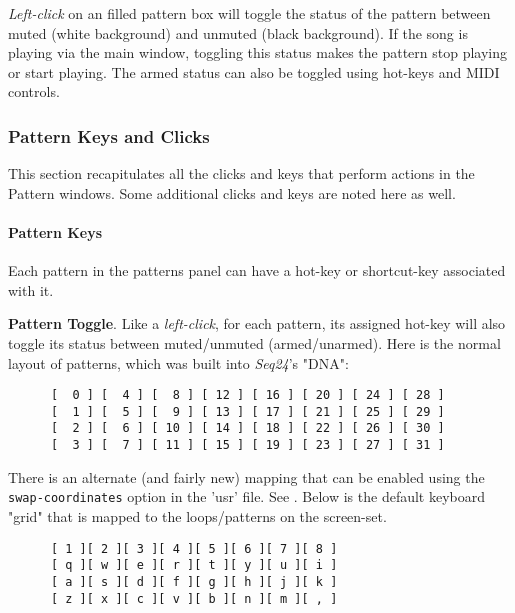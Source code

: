    \textsl{Left-click} on an filled pattern box will toggle the status of the
   pattern between muted (white background) and unmuted (black background).
   If the song is playing via the main window, toggling this status makes
   the pattern stop playing or start playing.  The armed status
   can also be toggled using hot-keys and MIDI controls.

\subsubsection{Pattern Keys and Clicks}
\label{subsubsec:patterns_pattern_keys_and_clicks}

   This section recapitulates all the clicks and keys that perform actions
   in the Pattern windows.  Some additional clicks and keys are noted here
   as well.

\paragraph{Pattern Keys}
\label{paragraph:patterns_pattern_keys}

   Each pattern in the patterns panel can have a hot-key or shortcut-key
   associated with it.

   \textbf{Pattern Toggle}.
   Like a \textsl{left-click}, for each pattern, its assigned hot-key will
   also toggle its status between muted/unmuted (armed/unarmed).
   Here is the normal layout of patterns, which was built into
   \textsl{Seq24}'s "DNA":

   \begin{verbatim}
      [  0 ] [  4 ] [  8 ] [ 12 ] [ 16 ] [ 20 ] [ 24 ] [ 28 ]
      [  1 ] [  5 ] [  9 ] [ 13 ] [ 17 ] [ 21 ] [ 25 ] [ 29 ]
      [  2 ] [  6 ] [ 10 ] [ 14 ] [ 18 ] [ 22 ] [ 26 ] [ 30 ]
      [  3 ] [  7 ] [ 11 ] [ 15 ] [ 19 ] [ 23 ] [ 27 ] [ 31 ]
   \end{verbatim}

   There is an alternate (and fairly new) mapping that can be enabled
   using the \texttt{swap-coordinates} option in the 'usr' file.
   See .
   Below is the default keyboard "grid" that is
   mapped to the loops/patterns on the screen-set.

   \begin{verbatim}
      [ 1 ][ 2 ][ 3 ][ 4 ][ 5 ][ 6 ][ 7 ][ 8 ]
      [ q ][ w ][ e ][ r ][ t ][ y ][ u ][ i ]
      [ a ][ s ][ d ][ f ][ g ][ h ][ j ][ k ]
      [ z ][ x ][ c ][ v ][ b ][ n ][ m ][ , ]
   \end{verbatim}

